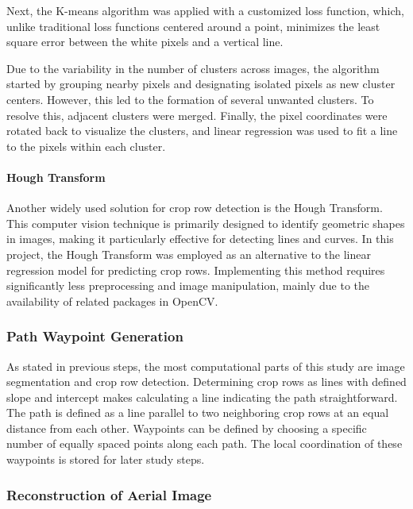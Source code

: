 \documentclass[conference]{IEEEtran}
\begin{document}
	Next, the K-means algorithm was applied with a customized loss function, which, unlike traditional loss functions centered around a point, minimizes the least square error between the white pixels and a vertical line. 
	
	Due to the variability in the number of clusters across images, the algorithm started by grouping nearby pixels and designating isolated pixels as new cluster centers. However, this led to the formation of several unwanted clusters. To resolve this, adjacent clusters were merged. Finally, the pixel coordinates were rotated back to visualize the clusters, and linear regression was used to fit a line to the pixels within each cluster.
	
	
	\paragraph{Hough Transform}\label{Hough Transform}\leavevmode
	
	Another widely used solution for crop row detection is the Hough Transform. This computer vision technique is primarily designed to identify geometric shapes in images, making it particularly effective for detecting lines and curves. In this project, the Hough Transform was employed as an alternative to the linear regression model for predicting crop rows. Implementing this method requires significantly less preprocessing and image manipulation, mainly due to the availability of related packages in OpenCV.
	
	\subsubsection{Path Waypoint Generation}\label{Path Waypoint Generation}\leavevmode
	
	As stated in previous steps, the most computational parts of this study are image segmentation and crop row detection. Determining crop rows as lines with defined slope and intercept makes calculating a line indicating the path straightforward. The path is defined as a line parallel to two neighboring crop rows at an equal distance from each other.
	Waypoints can be defined by choosing a specific number of equally spaced points along each path. The local coordination of these waypoints is stored for later study steps.
	
	\subsubsection{Reconstruction of Aerial Image}\label{Reconstruction of Aerial Image}\leavevmode
	
\end{document}
